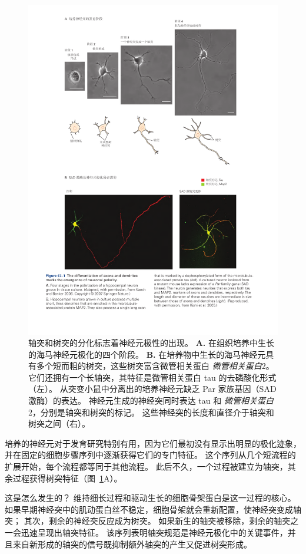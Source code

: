 \begin{figure}[htbp]
	\centering
	\includegraphics[width=0.91\linewidth]{chap47/fig_47_1}
	\caption{轴突和树突的分化标志着神经元极性的出现。
		\textbf{A.} 在组织培养中生长的海马神经元极化的四个阶段\cite{kaech2006culturing}。
		\textbf{B.} 在培养物中生长的海马神经元具有多个短而粗的树突，这些树突富含微管相关蛋白 \textit{微管相关蛋白}2。
		它们还拥有一个长轴突，其特征是微管相关蛋白 tau 的去磷酸化形式（左）。
		从突变小鼠中分离出的培养神经元缺乏 Par 家族基因（SAD 激酶）的表达。
		神经元生成的神经突同时表达 tau 和 \textit{微管相关蛋白}2，分别是轴突和树突的标记。
		这些神经突的长度和直径介于轴突和树突之间（右）\cite{kishi2005mammalian}。}
	\label{fig:47_1}
\end{figure}


培养的神经元对于发育研究特别有用，因为它们最初没有显示出明显的极化迹象，并在固定的细胞步骤序列中逐渐获得它们的专门特征。
这个序列从几个短流程的扩展开始，每个流程都等同于其他流程。
此后不久，一个过程被建立为轴突，其余过程获得树突特征（图~\ref{fig:47_1}A）。


这是怎么发生的？
维持细长过程和驱动生长的细胞骨架蛋白是这一过程的核心。
如果早期神经突中的肌动蛋白丝不稳定，细胞骨架就会重新配置，使神经突变成轴突；
其次，剩余的神经突反应成为树突。
如果新生的轴突被移除，剩余的轴突之一会迅速呈现出轴突特征。
该序列表明轴突规范是神经元极化中的关键事件，并且来自新形成的轴突的信号既抑制额外轴突的产生又促进树突形成。


